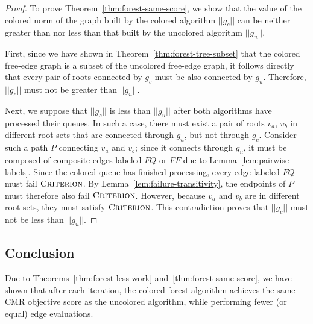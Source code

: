 \begin{proof}
To prove Theorem~\ref{thm:forest-same-score},
we show that the value of the colored norm of the graph built by the
colored algorithm $||g_c||$
can be neither greater than nor less than
that built by the uncolored algorithm $||g_u||$.

First, since we have shown in Theorem~\ref{thm:forest-tree-subset}
that the colored free-edge graph is a subset of the uncolored free-edge
graph,
it follows directly that every pair of roots connected by $g_c$
must be also connected by $g_u$.
Therefore, $||g_c||$ must not be greater than $||g_u||$.

Next, we suppose that $||g_c||$ is less than $||g_u||$
after both algorithms have processed their queues.
In such a case,
there must exist a pair of roots $v_a$, $v_b$ in different root sets
that are connected through $g_u$,
but not through $g_c$.
Consider such a path $P$ connecting $v_a$ and $v_b$;
since it connects through $g_u$,
it must be composed of composite edges labeled $FQ$ or $FF$
due to Lemma~\ref{lem:pairwise-labels}.
Since the colored queue has finished processing,
every edge labeled $FQ$ must fail $\textsc{Criterion}$.
By Lemma~\ref{lem:failure-transitivity},
the endpoints of $P$ must therefore also fail $\textsc{Criterion}$.
However, because $v_a$ and $v_b$ are in different root sets,
they must satisfy $\textsc{Criterion}$.
This contradiction proves that
$||g_c||$ must not be less than $||g_u||$.
\end{proof}


\subsection{Conclusion}

Due to Theorems~\ref{thm:forest-less-work}
and~\ref{thm:forest-same-score},
we have shown that after each iteration,
the colored forest algorithm achieves the same CMR objective score
as the uncolored algorithm,
while performing fewer (or equal) edge evaluations.

%
%

